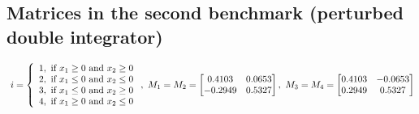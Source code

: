 \subsection*{Matrices in the second benchmark (perturbed double integrator)}
{\scriptsize
\begin{align*}~\label{eqn:pwa-regions}
i=\left\{\begin{array}{l}
1,~\text{if}~x_1\geq 0~\text{and}~x_2\geq 0\\
2,~\text{if}~x_1\leq 0~\text{and}~x_2\leq 0\\
3,~\text{if}~x_1\leq 0~\text{and}~x_2\geq 0\\
4,~\text{if}~x_1\geq 0~\text{and}~x_2\leq 0\\
\end{array} \right.,
~M_1=M_2=\left[\begin{matrix}
0.4103  &  0.0653\\
   -0.2949  &  0.5327
\end{matrix}\right],~M_3=M_4=\left[\begin{matrix}
0.4103  &  -0.0653\\
   0.2949  &  0.5327
\end{matrix}\right]
\end{align*}}


